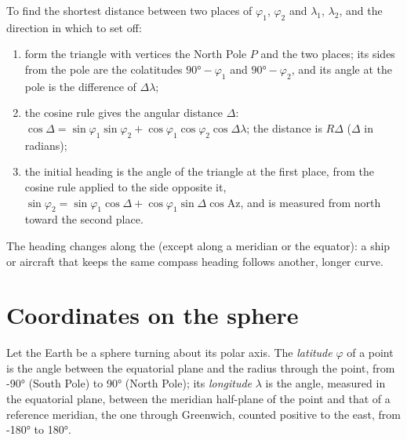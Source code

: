 \begin{method}\label{met:b1:spherical-astronomy:great-circle}
To find the shortest distance between two places of  $\varphi_1$,
$\varphi_2$ and  $\lambda_1$, $\lambda_2$, and the direction in
which to set off:
\begin{enumerate}
  \item form the triangle with vertices the North Pole $P$ and the two
        places; its sides from the pole are the colatitudes $\ang{90} -
        \varphi_1$ and $\ang{90} - \varphi_2$, and its angle at the pole is
        the difference of  $\Delta\lambda$;
  \item the cosine rule gives the angular distance $\Delta$:
        $\cos\Delta = \sin\varphi_1\sin\varphi_2 +
        \cos\varphi_1\cos\varphi_2\cos\Delta\lambda$; the distance is
        $R\Delta$ ($\Delta$ in radians);
  \item the initial heading is the angle of the triangle at the first place,
        from the cosine rule applied to the side opposite it,
        $\sin\varphi_2 = \sin\varphi_1\cos\Delta + \cos\varphi_1\sin\Delta\cos
        \mathrm{Az}$, and is measured from north toward the second place.
\end{enumerate}
The heading changes along the  (except along a meridian or the
equator): a ship or aircraft that keeps the same compass heading follows
another, longer curve.
\end{method}

\section{Coordinates on the sphere}

\begin{definition}\label{def:b1:spherical-astronomy:geographic}
Let the Earth be a sphere turning about its polar axis. The
\emph{latitude} $\varphi$ of a point is the angle between
the equatorial plane and the radius through the point, from \ang{-90}
(South Pole) to \ang{+90} (North Pole); its \emph{longitude}
$\lambda$ is the angle, measured in the equatorial plane, between the
meridian half-plane of the point and that of a reference meridian, the one
through Greenwich, counted positive to the east, from \ang{-180} to
\ang{180}.
\end{definition}

